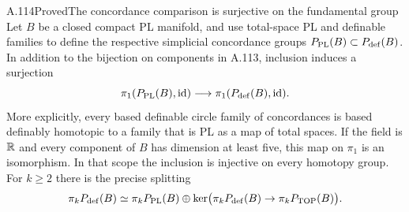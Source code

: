 \begin{saresult}{A.114}{Proved}{The concordance comparison is surjective on the fundamental group}
Let $B$ be a closed compact PL manifold, and use total-space PL and
definable families to define the respective simplicial concordance
groups $P_{\rm PL}(B)\subset P_{\rm def}(B)$. In addition to the
bijection on components in A.113, inclusion induces a surjection
\[
 \pi_1(P_{\rm PL}(B),\operatorname{id})
 \longrightarrow
 \pi_1(P_{\rm def}(B),\operatorname{id}).
\]
More explicitly, every based definable circle family of concordances
is based definably homotopic to a family that is PL as a map of
total spaces.
If the field is $\mathbb R$ and every component of $B$ has dimension at
least five, this map on $\pi_1$ is an isomorphism. In that scope
the inclusion is injective on every homotopy group.
For $k\ge2$ there is the precise splitting
\[
 \pi_kP_{\rm def}(B)\simeq
 \pi_kP_{\rm PL}(B)\oplus
 \ker\bigl(\pi_kP_{\rm def}(B)\to\pi_kP_{\rm TOP}(B)\bigr).
\]
\end{saresult}
